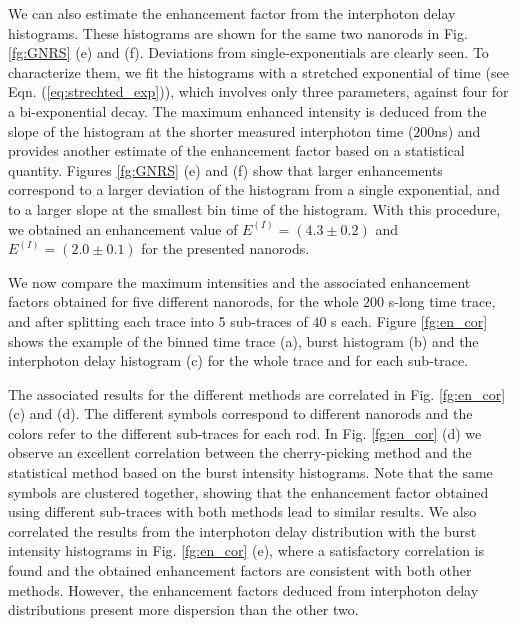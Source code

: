 We can also estimate the enhancement factor from the interphoton delay histograms. These histograms are shown for the same
two nanorods in Fig. \ref{fg:GNRS} (e) and (f). 
Deviations from single-exponentials are clearly seen. To characterize them, we fit the histograms 
with a stretched exponential of time (see Eqn. (\ref{eq:strechted_exp})), which involves only 
three parameters, against four for a bi-exponential decay. The maximum enhanced intensity is deduced from 
the slope of the histogram at the shorter measured interphoton time ($200$ns) and provides another estimate of the 
enhancement factor based on a statistical quantity. Figures \ref{fg:GNRS} (e) and (f) 
show that larger enhancements correspond to a larger deviation of the histogram from a 
single exponential, and to a larger slope at the smallest bin time of the histogram. With 
this procedure, we obtained an enhancement value of $E^{(I)}=(4.3 \pm 0.2)$ and 
$E^{(I)}=(2.0\pm 0.1)$ for the presented nanorods.


We now compare the maximum intensities and the associated enhancement factors obtained 
for five different nanorods, for the whole $200$ s-long time trace, and after splitting each trace into 5 sub-traces 
of $40$ s each. Figure \ref{fg:en_cor} shows the example of the binned time trace (a),
burst histogram (b) and the interphoton delay histogram (c) for the whole trace and for each sub-trace. 

The associated results for the different methods are correlated in Fig. \ref{fg:en_cor} (c) and (d).
The different symbols correspond to different nanorods and the colors refer to the different sub-traces for each rod. 
In Fig. \ref{fg:en_cor} (d) we observe an excellent correlation between the cherry-picking method and the
statistical method based on the burst intensity histograms. Note that the same symbols are clustered together,
showing that the enhancement factor obtained using different sub-traces with both methods lead to similar results.
We also correlated the results from the interphoton delay distribution with the burst intensity histograms in 
Fig. \ref{fg:en_cor} (e), where a satisfactory correlation is found and the obtained enhancement factors
are consistent with both other methods. However, the enhancement factors deduced from interphoton delay distributions present more dispersion than the other two. 


